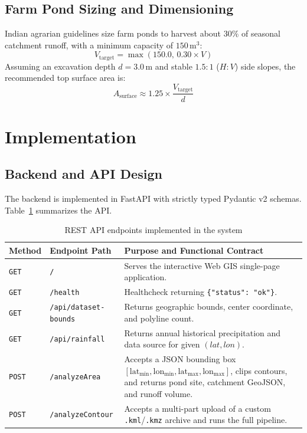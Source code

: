 \documentclass[manuscript,screen,review]{acmart}
\begin{document}
\subsection{Farm Pond Sizing and Dimensioning}
Indian agrarian guidelines size farm ponds to harvest about $30\%$ of seasonal catchment runoff, with a minimum capacity of $150\,\text{m}^3$:
\begin{equation}
    V_{\text{target}} = \max\left(150.0,\, 0.30 \times V\right)
\end{equation}
Assuming an excavation depth $d = 3.0\,\text{m}$ and stable $1.5:1$ ($H:V$) side slopes, the recommended top surface area is:
\begin{equation}
    A_{\text{surface}} \approx 1.25 \times \frac{V_{\text{target}}}{d}
\end{equation}

\section{Implementation}
\label{sec:implementation}

\subsection{Backend and API Design}
The backend is implemented in FastAPI with strictly typed Pydantic v2 schemas. Table~\ref{tab:api-endpoints} summarizes the API.

\begin{table}[!ht]
\small
  \caption{REST API endpoints implemented in the system}
  \label{tab:api-endpoints}
  \begin{tabular}{p{2.0cm}p{4.2cm}p{7.3cm}}
    \toprule
    \textbf{Method} & \textbf{Endpoint Path} & \textbf{Purpose and Functional Contract} \\
    \midrule
    \texttt{GET} & \texttt{/} & Serves the interactive Web GIS single-page application. \\
    \texttt{GET} & \texttt{/health} & Healthcheck returning \texttt{\{"status": "ok"\}}. \\
    \texttt{GET} & \texttt{/api/dataset-bounds} & Returns geographic bounds, center coordinate, and polyline count. \\
    \texttt{GET} & \texttt{/api/rainfall} & Returns annual historical precipitation and data source for given $(lat, lon)$. \\
    \texttt{POST} & \texttt{/analyzeArea} & Accepts a JSON bounding box $[\text{lat}_{\min}, \text{lon}_{\min}, \text{lat}_{\max}, \text{lon}_{\max}]$, clips contours, and returns pond site, catchment GeoJSON, and runoff volume. \\
    \texttt{POST} & \texttt{/analyzeContour} & Accepts a multi-part upload of a custom \texttt{.kml}/\texttt{.kmz} archive and runs the full pipeline. \\
    \bottomrule
  \end{tabular}
\end{table}
\end{document}
